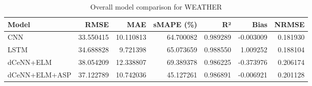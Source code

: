 \begin{table}
\caption{Overall model comparison for WEATHER}
\begin{tabular}{lrrrrrr}
\toprule
Model & RMSE & MAE & sMAPE (\%) & R² & Bias & NRMSE \\
\midrule
CNN & 33.550415 & 10.110813 & 64.700082 & 0.989289 & -0.003009 & 0.181930 \\
LSTM & 34.688828 & 9.721398 & 65.073659 & 0.988550 & 1.009252 & 0.188104 \\
dCeNN+ELM & 38.054209 & 12.338807 & 69.389378 & 0.986225 & -0.373976 & 0.206174 \\
dCeNN+ELM+ASP & 37.122789 & 10.742036 & 45.127261 & 0.986891 & -0.006921 & 0.201128 \\
\bottomrule
\end{tabular}
\end{table}
